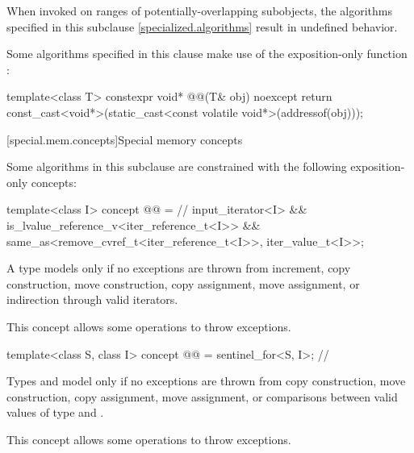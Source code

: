 \pnum
\begin{note}
When invoked on ranges of
potentially-overlapping subobjects,
the algorithms specified in this subclause \ref{specialized.algorithms}
result in undefined behavior.
\end{note}

\pnum
Some algorithms specified in this clause make use of the exposition-only function
:
\begin{codeblock}
template<class T>
  constexpr void* @@(T& obj) noexcept {
    return const_cast<void*>(static_cast<const volatile void*>(addressof(obj)));
  }
\end{codeblock}

[special.mem.concepts]{Special memory concepts}

\pnum
Some algorithms in this subclause are constrained with the following
exposition-only concepts:

\begin{itemdecl}
template<class I>
concept @@ = // \expos
  input_iterator<I> &&
  is_lvalue_reference_v<iter_reference_t<I>> &&
  same_as<remove_cvref_t<iter_reference_t<I>>, iter_value_t<I>>;
\end{itemdecl}

\begin{itemdescr}
\pnum
A type  models  only if
no exceptions are thrown from increment,
copy construction, move construction,
copy assignment, move assignment,
or indirection through valid iterators.

\pnum
\begin{note}
This concept allows some 
operations to throw exceptions.
\end{note}
\end{itemdescr}

\begin{itemdecl}
template<class S, class I>
concept @@ = sentinel_for<S, I>; // \expos
\end{itemdecl}

\begin{itemdescr}
\pnum
Types  and  model 
only if no exceptions are thrown from copy construction, move construction,
copy assignment, move assignment, or comparisons between
valid values of type  and .

\pnum
\begin{note}
This concept allows some 
operations to throw exceptions.
\end{note}
\end{itemdescr}


